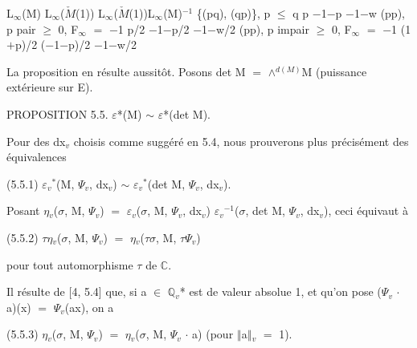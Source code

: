 \documentclass[10pt,twoside]{article}
\begin{document}
L\ensuremath{_{∞}}(M)       L\ensuremath{_{∞}}(\ensuremath{\check{M}}(1))       L\ensuremath{_{∞}}(\ensuremath{\check{M}}(1))L\ensuremath{_{∞}}(M)\ensuremath{^{-1}} \{(pq), (qp)\}, p \ensuremath{≤} q                  p             \ensuremath{−}1\ensuremath{−}p                   \ensuremath{−}1\ensuremath{−}w (pp), p pair \ensuremath{≥} 0, F\ensuremath{_{∞}} \ensuremath{=} \ensuremath{−}1          p/2           \ensuremath{−}1\ensuremath{−}p/2                 \ensuremath{−}1\ensuremath{−}w/2 (pp), p impair \ensuremath{≥} 0, F\ensuremath{_{∞}} \ensuremath{=} \ensuremath{−}1        (1\ensuremath{+}p)/2       (\ensuremath{−}1\ensuremath{−}p)/2               \ensuremath{−}1\ensuremath{−}w/2\par
La proposition en résulte aussitôt. Posons det M \ensuremath{=} \ensuremath{∧}\ensuremath{^{d(M)}}M (puissance extérieure sur E).\par
PROPOSITION 5.5. \ensuremath{ε}*(M) \ensuremath{∼} \ensuremath{ε}*(det M).\par
Pour des dx\ensuremath{_{v}} choisis comme suggéré en 5.4, nous prouverons plus précisément des équivalences\par
(5.5.1)    \ensuremath{ε}\ensuremath{_{v}}\ensuremath{^{*}}(M, \ensuremath{Ψ}\ensuremath{_{v}}, dx\ensuremath{_{v}}) \ensuremath{∼} \ensuremath{ε}\ensuremath{_{v}}\ensuremath{^{*}}(det M, \ensuremath{Ψ}\ensuremath{_{v}}, dx\ensuremath{_{v}}).\par
Posant \ensuremath{η}\ensuremath{_{v}}(\ensuremath{σ}, M, \ensuremath{Ψ}\ensuremath{_{v}}) \ensuremath{=} \ensuremath{ε}\ensuremath{_{v}}(\ensuremath{σ}, M, \ensuremath{Ψ}\ensuremath{_{v}}, dx\ensuremath{_{v}}) \ensuremath{ε}\ensuremath{_{v}}\ensuremath{^{-1}}(\ensuremath{σ}, det M, \ensuremath{Ψ}\ensuremath{_{v}}, dx\ensuremath{_{v}}), ceci équivaut à\par
(5.5.2)    \ensuremath{τ}\ensuremath{η}\ensuremath{_{v}}(\ensuremath{σ}, M, \ensuremath{Ψ}\ensuremath{_{v}}) \ensuremath{=} \ensuremath{η}\ensuremath{_{v}}(\ensuremath{τ}\ensuremath{σ}, M, \ensuremath{τ}\ensuremath{Ψ}\ensuremath{_{v}})\par
pour tout automorphisme \ensuremath{τ} de \ensuremath{ℂ}.\par
Il résulte de [4, 5.4] que, si a \ensuremath{∈} \ensuremath{ℚ}\ensuremath{_{v}}* est de valeur absolue 1, et qu’on pose (\ensuremath{Ψ}\ensuremath{_{v}} \ensuremath{·} a)(x) \ensuremath{=} \ensuremath{Ψ}\ensuremath{_{v}}(ax), on a\par
(5.5.3)    \ensuremath{η}\ensuremath{_{v}}(\ensuremath{σ}, M, \ensuremath{Ψ}\ensuremath{_{v}}) \ensuremath{=} \ensuremath{η}\ensuremath{_{v}}(\ensuremath{σ}, M, \ensuremath{Ψ}\ensuremath{_{v}} \ensuremath{·} a)   (pour \ensuremath{‖}a\ensuremath{‖}\ensuremath{_{v}} \ensuremath{=} 1).\par
\end{document}
